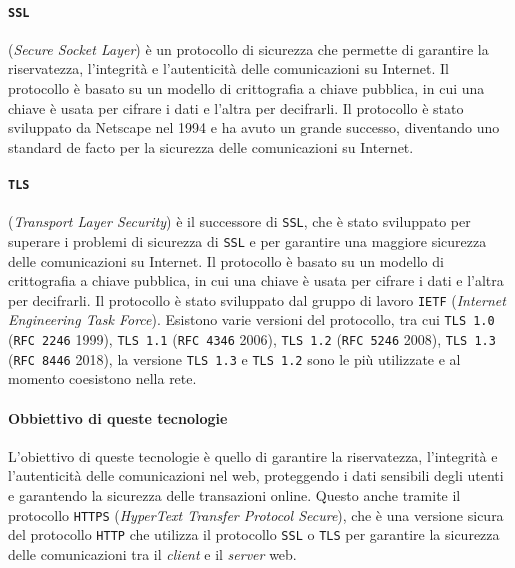     \paragraph{\texttt{SSL}} (\textit{Secure Socket Layer}) è un protocollo di sicurezza che permette di garantire la riservatezza, l'integrità e l'autenticità delle comunicazioni su Internet. Il protocollo è basato su un modello di crittografia a chiave pubblica, in cui una chiave è usata per cifrare i dati e l'altra per decifrarli. Il protocollo è stato sviluppato da Netscape nel 1994 e ha avuto un grande successo, diventando uno standard de facto per la sicurezza delle comunicazioni su Internet.
    \paragraph{\texttt{TLS}} (\textit{Transport Layer Security}) è il successore di \texttt{SSL}, che è stato sviluppato per superare i problemi di sicurezza di \texttt{SSL} e per garantire una maggiore sicurezza delle comunicazioni su Internet. Il protocollo è basato su un modello di crittografia a chiave pubblica, in cui una chiave è usata per cifrare i dati e l'altra per decifrarli. Il protocollo è stato sviluppato dal gruppo di lavoro \texttt{IETF} (\textit{Internet Engineering Task Force}). Esistono varie versioni del protocollo, tra cui \texttt{TLS 1.0} (\texttt{RFC 2246} 1999), \texttt{TLS 1.1} (\texttt{RFC 4346} 2006), \texttt{TLS 1.2} (\texttt{RFC 5246} 2008), \texttt{TLS 1.3} (\texttt{RFC 8446} 2018), la versione \texttt{TLS 1.3} e \texttt{TLS 1.2} sono le più utilizzate e al momento coesistono nella rete.
    \paragraph{Obbiettivo di queste tecnologie} L'obiettivo di queste tecnologie è quello di garantire la riservatezza, l'integrità e l'autenticità delle comunicazioni nel web, proteggendo i dati sensibili degli utenti e garantendo la sicurezza delle transazioni online. Questo anche tramite il protocollo \texttt{HTTPS} (\textit{HyperText Transfer Protocol Secure}), che è una versione sicura del protocollo \texttt{HTTP} che utilizza il protocollo \texttt{SSL} o \texttt{TLS} per garantire la sicurezza delle comunicazioni tra il \textit{client} e il \textit{server} web.